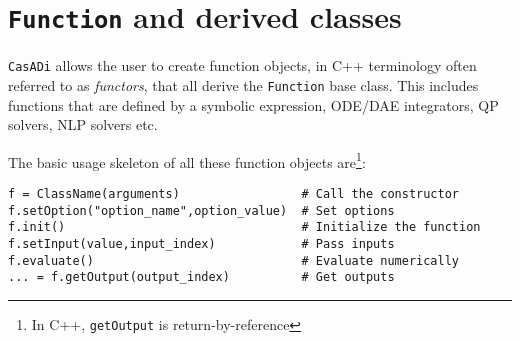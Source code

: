 \documentclass[a4paper,12pt]{book}
\newcommand{\CasADi}{\texttt{CasADi}\xspace}
\newcounter{pytexcount}
\newcounter{pytexsubcount}
\newenvironment{pytexTemplate}[1]{
\begin{rawhtml}
<div style="display:none">
\end{rawhtml}
}{
\begin{rawhtml}
</div>
\end{rawhtml}
}
\newcommand{\pytexStart}[1]{
  \addtocounter{pytexcount}{1}%
  \setcounter{pytexsubcount}{0}%
}
\renewenvironment{pytex}
{\addtocounter{pytexsubcount}{1}%
\begin{rawhtml}
<div style="color: black; background-color: \#b9c8db;  border-style: dotted; border-width: 1px; padding:2px;padding-left:1em" >
<pre>
\end{rawhtml}
}%
{\begin{rawhtml}
</pre>
</div>
<div style="color: black; background-color: \#fffff;  border-style: solid; border-width: 1px; padding:2px;padding-left:1em;margin-left:1em;" >\end{rawhtml}%
\verbatiminputeval{pytex_\alph{pytexcount}_\arabic{pytexsubcount}.log}%
\begin{rawhtml}
</div>
\end{rawhtml}
}
\begin{document}






\section{\texttt{Function} and derived classes} \label{sec:function}
\CasADi allows the user to create function objects, in C++ terminology often referred to as \emph{functors}, that all derive the \texttt{Function} base class. This includes functions that are defined by a symbolic expression, ODE/DAE integrators, QP solvers, NLP solvers etc.

The basic usage skeleton of all these function objects are\footnote{In C++, \texttt{getOutput} is return-by-reference}:
\begin{verbatim}
f = ClassName(arguments)                 # Call the constructor
f.setOption("option_name",option_value)  # Set options
f.init()                                 # Initialize the function
f.setInput(value,input_index)            # Pass inputs
f.evaluate()                             # Evaluate numerically
... = f.getOutput(output_index)          # Get outputs
\end{verbatim}
\end{document}
